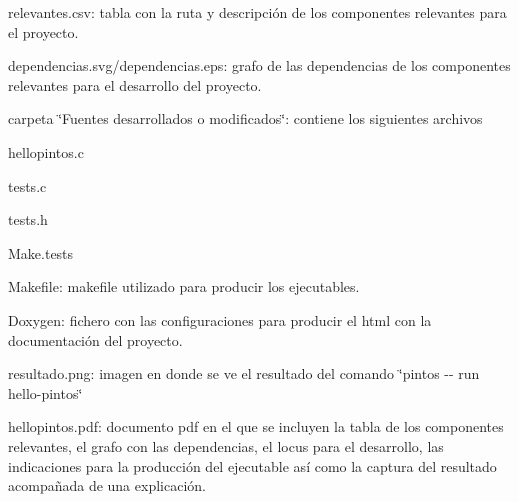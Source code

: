 
\begin{DoxyItemize}
\item relevantes.\+csv\+: tabla con la ruta y descripción de los componentes relevantes para el proyecto.
\item dependencias.\+svg/dependencias.eps\+: grafo de las dependencias de los componentes relevantes para el desarrollo del proyecto.
\item carpeta \char`\"{}\+Fuentes desarrollados o modificados\char`\"{}\+: contiene los siguientes archivos
\begin{DoxyItemize}
\item hellopintos.\+c
\item tests.\+c
\item tests.\+h
\item Make.\+tests
\end{DoxyItemize}
\item Makefile\+: makefile utilizado para producir los ejecutables.
\item Doxygen\+: fichero con las configuraciones para producir el html con la documentación del proyecto.
\item resultado.\+png\+: imagen en donde se ve el resultado del comando \char`\"{}pintos -\/-\/ run hello-\/pintos\char`\"{}
\item hellopintos.\+pdf\+: documento pdf en el que se incluyen la tabla de los componentes relevantes, el grafo con las dependencias, el locus para el desarrollo, las indicaciones para la producción del ejecutable así como la captura del resultado acompañada de una explicación. 
\end{DoxyItemize}
